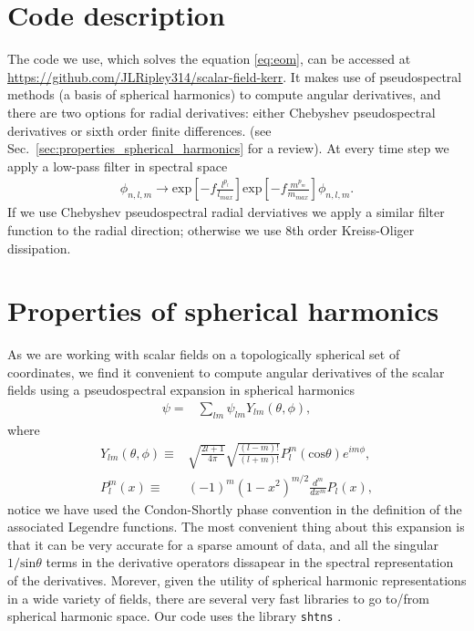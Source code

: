 \documentclass[%
 prd,
amsmath,amssymb,
preprint,%
]{revtex4-1}
\begin{document}
\section{\label{sec:code_description}
   Code description
   }
   The code we use, which solves the equation \eqref{eq:eom},
   can be accessed at 
   \url{https://github.com/JLRipley314/scalar-field-kerr}.
   It makes use of pseudospectral methods 
   (a basis of spherical harmonics) to compute angular derivatives,
   and there are two options for radial derivatives: either Chebyshev
   pseudospectral derivatives or sixth order finite differences.
   (see Sec.~\ref{sec:properties_spherical_harmonics} for a review).
   At every time step we apply a low-pass filter in spectral space 
   \begin{align}
      \phi_{n,l,m}
      \to
      \mathrm{exp}\left[-f\frac{l^{p_l}}{l_{max}}\right]
      \mathrm{exp}\left[-f\frac{m^{p_m}}{m_{max}}\right]
      \phi_{n,l,m}
      .
   \end{align}
   If we use Chebyshev pseudospectral radial derviatives we apply
   a similar filter function to the radial direction; otherwise
   we use 8th order Kreiss-Oliger dissipation.
\section{\label{sec:properties_spherical_harmonics}
   Properties of spherical harmonics
   }
As we are working with scalar fields on a topologically spherical set
of coordinates, we find it convenient to compute angular derivatives
of the scalar fields using a pseudospectral expansion
in spherical harmonics
\begin{align}
   \psi
   =&
   \sum_{lm} \psi_{lm}Y_{lm}\left(\theta,\phi\right)
   ,
\end{align}
where
\begin{align}
   Y_{lm}\left(\theta,\phi\right)
   \equiv&
   \sqrt{
      \frac{2l+1}{4\pi}
   }
   \sqrt{
      \frac{(l-m)!}{(l+m)!}
   }
   P^m_l\left(\mathrm{cos}\theta\right)
   e^{im\phi}
   ,\\
   P^m_l\left(x\right)
   \equiv&
   \left(-1\right)^m
   \left(1-x^2\right)^{m/2}\frac{d^m}{dx^m}P_l\left(x\right)
   ,
\end{align}
notice we have used the Condon-Shortly phase convention in the
definition of the associated Legendre functions.
The most convenient thing about this expansion is that it can be
very accurate for a sparse amount of data, and all the singular
$1/\mathrm{sin}\theta$ terms in the derivative operators
dissapear in the spectral representation of the derivatives.
Morever, given the utility of spherical harmonic representations in a 
wide variety of fields, there are several very fast libraries to 
go to/from spherical harmonic space.
Our code uses the library \texttt{shtns} \cite{2013GGG....14..751S}.
\end{document}

